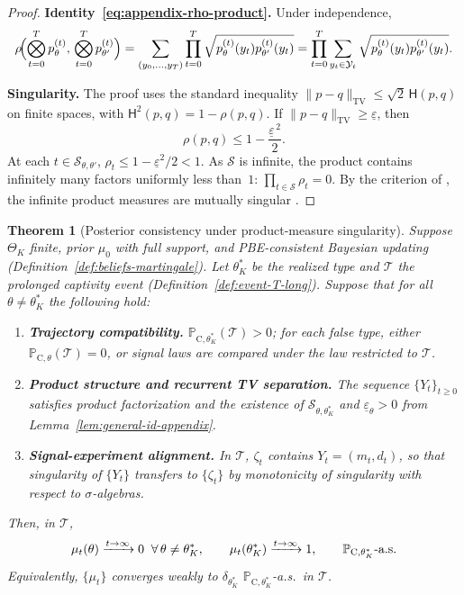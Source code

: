 \documentclass[ecta,nameyear,final,supplement]{econsocart}
\numberwithin{equation}{section}
\numberwithin{table}{section}
\newtheorem{theorem}{Theorem}[section]
\theoremstyle{definition}
\newcommand{\ProbC}[1]{\mathbb{P}_{\mathrm{C},#1}}
\begin{document}
\begin{proof}
\textbf{Identity~\eqref{eq:appendix-rho-product}.}
Under independence,
\[
\rho\!\Bigl(\bigotimes_{t=0}^{T}p_\theta^{(t)},\,
            \bigotimes_{t=0}^{T}p_{\theta'}^{(t)}\Bigr)
=\sum_{(y_0,\ldots,y_T)}\prod_{t=0}^{T}\sqrt{p_\theta^{(t)}(y_t)p_{\theta'}^{(t)}(y_t)}
=\prod_{t=0}^{T}\sum_{y_t\in\mathcal{Y}_t}
  \sqrt{p_\theta^{(t)}(y_t)p_{\theta'}^{(t)}(y_t)}.
\]

\noindent\textbf{Singularity.}
The proof uses the standard inequality
$\|p-q\|_{\mathrm{TV}}\le\sqrt{2}\,\mathsf{H}(p,q)$
on finite spaces, with $\mathsf{H}^2(p,q)=1-\rho(p,q)$. If
$\|p-q\|_{\mathrm{TV}}\ge\underline\varepsilon$, then
\[
\rho(p,q)\le 1-\frac{\underline\varepsilon^{\,2}}{2}.
\]
At each $t\in\mathcal{S}_{\theta,\theta'}$,
$\rho_t\le 1-\underline\varepsilon^2/2<1$. As $\mathcal{S}$ is infinite, the
product contains infinitely many factors uniformly less than~$1$:
$\prod_{t\in\mathcal{S}}\rho_t=0$. By the criterion of \citet{Kakutani1948},
the infinite product measures are mutually singular
\citep{Shiryaev2019Probability}.
\end{proof}

\bigskip

\begin{theorem}[Posterior consistency under product-measure singularity]
\label{thm:posterior-consistency-appendix}
Suppose $\Theta_K$ finite, prior $\mu_0$ with full support, and PBE-consistent
Bayesian updating (Definition~\ref{def:beliefs-martingale}).
Let $\theta_K^\ast$ be the realized type and $\mathcal{T}$ the prolonged
captivity event (Definition~\ref{def:event-T-long}). Suppose that for all
$\theta\neq\theta_K^\ast$ the following hold:
\begin{enumerate}
  \item[\textup{(i)}] \textbf{Trajectory compatibility.}
  $\ProbC{\theta_K^\ast}(\mathcal{T})>0$; for each false type, either
  $\ProbC{\theta}(\mathcal{T})=0$, or signal laws are compared under the law
  restricted to $\mathcal{T}$.
  \item[\textup{(ii)}] \textbf{Product structure and recurrent TV separation.}
  The sequence $\{Y_t\}_{t\ge 0}$ satisfies product factorization and the
  existence of $\mathcal{S}_{\theta,\theta_K^\ast}$ and
  $\underline\varepsilon_\theta>0$ from Lemma~\ref{lem:general-id-appendix}.
  \item[\textup{(iii)}] \textbf{Signal-experiment alignment.}
  In $\mathcal{T}$, $\zeta_t$ contains $Y_t=(m_t,d_t)$, so that singularity of
  $\{Y_t\}$ transfers to $\{\zeta_t\}$ by monotonicity of singularity with
  respect to $\sigma$-algebras.
\end{enumerate}
Then, in $\mathcal{T}$,
\[
\mu_t(\theta)\xrightarrow{t\to\infty}0\;\;\forall\,\theta\neq\theta_K^\ast,
\qquad
\mu_t(\theta_K^\ast)\xrightarrow{t\to\infty}1,
\qquad\ProbC{\theta_K^\ast}\textup{-a.s.}
\]
Equivalently, $\{\mu_t\}$ converges weakly to $\delta_{\theta_K^\ast}$
$\ProbC{\theta_K^\ast}$-a.s.\ in $\mathcal{T}$.
\end{theorem}
\end{document}
